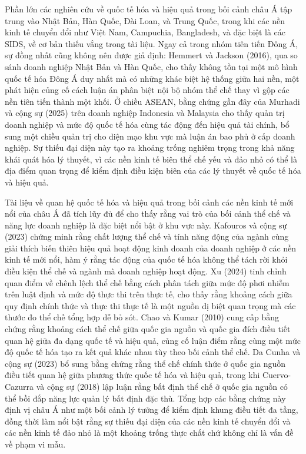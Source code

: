 \documentclass[
  a4paper,
  13pt]{extreport}
\begin{document}
Phần lớn các nghiên cứu về quốc tế hóa và hiệu quả trong bối cảnh châu Á
tập trung vào Nhật Bản, Hàn Quốc, Đài Loan, và Trung Quốc, trong khi các
nền kinh tế chuyển đổi như Việt Nam, Campuchia, Bangladesh, và đặc biệt
là các SIDS, về cơ bản thiếu vắng trong tài liệu. Ngay cả trong nhóm
tiên tiến Đông Á, sự đồng nhất cũng không nên được giả định: Hemmert và
Jackson (2016), qua so sánh doanh nghiệp Nhật Bản và Hàn Quốc, cho thấy
không tồn tại một mô hình quốc tế hóa Đông Á duy nhất mà có những khác
biệt hệ thống giữa hai nền, một phát hiện củng cố cách luận án phân biệt
nội bộ nhóm thể chế thay vì gộp các nền tiên tiến thành một khối. Ở
chiều ASEAN, bằng chứng gần đây của Murhadi và cộng sự (2025) trên doanh
nghiệp Indonesia và Malaysia cho thấy quản trị doanh nghiệp và mức độ
quốc tế hóa cùng tác động đến hiệu quả tài chính, bổ sung một chiều quản
trị cho diện mạo khu vực mà luận án bao phủ ở cấp doanh nghiệp. Sự thiếu
đại diện này tạo ra khoảng trống nghiêm trọng trong khả năng khái quát
hóa lý thuyết, vì các nền kinh tế biên thể chế yếu và đảo nhỏ có thể là
địa điểm quan trọng để kiểm định điều kiện biên của các lý thuyết về
quốc tế hóa và hiệu quả.

Tài liệu về quan hệ quốc tế hóa và hiệu quả trong bối cảnh các nền kinh
tế mới nổi của châu Á đã tích lũy đủ để cho thấy rằng vai trò của bối
cảnh thể chế và năng lực doanh nghiệp là đặc biệt nổi bật ở khu vực này.
Kafouros và cộng sự (2023) chứng minh rằng chất lượng thể chế và tính
năng động của ngành cùng giải thích biến thiên hiệu quả hoạt động kinh
doanh của doanh nghiệp ở các nền kinh tế mới nổi, hàm ý rằng tác động
của quốc tế hóa không thể tách rời khỏi điều kiện thể chế và ngành mà
doanh nghiệp hoạt động. Xu (2024) tinh chỉnh quan điểm về chênh lệch thể
chế bằng cách phân tách giữa mức độ phơi nhiễm trên luật định và mức độ
thực thi trên thực tế, cho thấy rằng khoảng cách giữa quy định chính
thức và thực thi thực tế là một nguồn dị biệt quan trọng mà các thước đo
thể chế tổng hợp dễ bỏ sót. Chao và Kumar (2010) cung cấp bằng chứng
rằng khoảng cách thể chế giữa quốc gia nguồn và quốc gia đích điều tiết
quan hệ giữa đa dạng quốc tế và hiệu quả, củng cố luận điểm rằng cùng
một mức độ quốc tế hóa tạo ra kết quả khác nhau tùy theo bối cảnh thể
chế. Da Cunha và cộng sự (2023) bổ sung bằng chứng rằng thể chế chính
thức ở quốc gia nguồn điều tiết quan hệ giữa phương thức quốc tế hóa và
hiệu quả, trong khi Cuervo-Cazurra và cộng sự (2018) lập luận rằng bất
định thể chế ở quốc gia nguồn có thể bồi đắp năng lực quản lý bất định
đặc thù. Tổng hợp các bằng chứng này định vị châu Á như một bối cảnh lý
tưởng để kiểm định khung điều tiết đa tầng, đồng thời làm nổi bật rằng
sự thiếu đại diện của các nền kinh tế chuyển đổi và các nền kinh tế đảo
nhỏ là một khoảng trống thực chất chứ không chỉ là vấn đề về phạm vi
mẫu.
\end{document}
